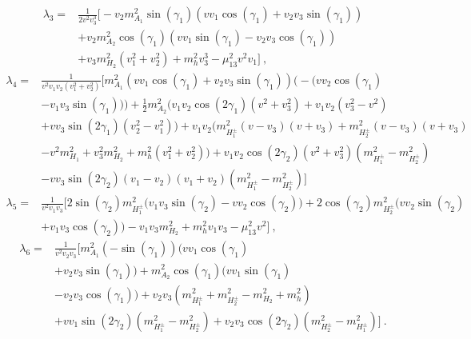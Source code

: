 \documentclass[10pt]{report}
\begin{document}
%
\begin{equation}
\begin{split}
 \lambda_3 = & \frac{1}{2 v^2 v_3^3} \Bigg[ - v_2 m_{A_1}^2 \sin \left(\gamma _1\right) \left(v v_1 \cos \left(\gamma _1\right)+v_2 v_3 \sin \left(\gamma _1\right)\right) \\ & +  v_2 m_{A_2}^2 \cos \left(\gamma _1\right) \left(v v_1 \sin \left(\gamma _1\right)-v_2 v_3 \cos \left(\gamma _1\right)\right) \\ & +v_3 m_{H_2}^2 \left(v_1^2+v_2^2\right)+m_h^2 v_3^3-\mu_{13}^2 v^2 v_1 \Bigg] 
   \ ,
\end{split}
\end{equation}
%
\begin{equation}
\begin{split}
 \lambda_4 = &  \frac{1}{v^2 v_1 v_2 \left(v_1^2+v_2^2\right)} \Bigg[ m_{A_1}^2 \left(v v_1 \cos \left(\gamma _1\right)+v_2 v_3 \sin \left(\gamma _1\right)\right) \Bigg(-\Big(v v_2 \cos \left(\gamma _1\right) \\ & -v_1 v_3 \sin \left(\gamma _1\right)\Big)\Bigg)+\frac{1}{2} m_{A_2}^2 \Bigg(v_1 v_2 \cos \left(2 \gamma _1\right) \left(v^2+v_3^2\right)+v_1 v_2 \left(v_3^2-v^2\right) \\ & +v v_3 \sin \left(2 \gamma _1\right) \left(v_2^2-v_1^2\right)\Bigg)+v_1 v_2 \Big(m_{H_1^\pm}^2 (v-v_3) (v+v_3)+m_{H_2^\pm}^2 (v-v_3) (v+v_3) \\ & -v^2 m_{H_1}^2+v_3^2 m_{H_2}^2+m_h^2 \left(v_1^2+v_2^2\right)\Big)+v_1 v_2 \cos \left(2 \gamma _2\right) \left(v^2+v_3^2\right) \left(m_{H_1^\pm}^2-m_{H_2^\pm}^2\right) \\ & -v v_3 \sin \left(2 \gamma _2\right) (v_1-v_2) (v_1+v_2) \left(m_{H_1^\pm}^2-m_{H_2^\pm}^2\right) \Bigg] 
\end{split} 
\end{equation}
%
\begin{equation}
\begin{split}
\lambda_5 = & \frac{1}{v^2 v_1 v_3} \Bigg[ 2 \sin \left(\gamma _2\right) m_{H_1^\pm}^2 \Big(v_1 v_3 \sin \left(\gamma _2\right)  -v v_2 \cos \left(\gamma _2\right)\Big)+ 2 \cos \left(\gamma _2\right) m_{H_2^\pm}^2 \Big(v v_2 \sin \left(\gamma _2\right) \\ & + v_1 v_3 \cos \left(\gamma _2\right)\Big)-v_1 v_3 m_{H_2}^2+m_h^2 v_1 v_3-\mu_{13}^2 v^2 \Bigg] \ , 
\end{split} 
\end{equation}
%
\begin{equation}
\begin{split}
\lambda_6 = & \frac{1}{v^2 v_2 v_3} \Bigg[ m_{A_1}^2 \left(-\sin \left(\gamma _1\right)\right) \Big(v v_1 \cos \left(\gamma _1\right) \\ & +v_2 v_3 \sin \left(\gamma _1\right)\Big)+m_{A_2}^2 \cos \left(\gamma _1\right) \Big(v v_1 \sin \left(\gamma _1\right) \\ &-v_2 v_3 \cos \left(\gamma _1\right)\Big)+v_2 v_3 \left(m_{H_1^\pm}^2+m_{H_2^\pm}^2-m_{H_2}^2+m_h^2\right) \\ & +v v_1 \sin \left(2 \gamma _2\right) \left(m_{H_1^\pm}^2-m_{H_2^\pm}^2\right)+v_2 v_3 \cos \left(2 \gamma _2\right) \left(m_{H_2^\pm}^2-m_{H_1^\pm}^2\right) \Bigg] \ . 
\end{split} 
\end{equation}
\end{document}
